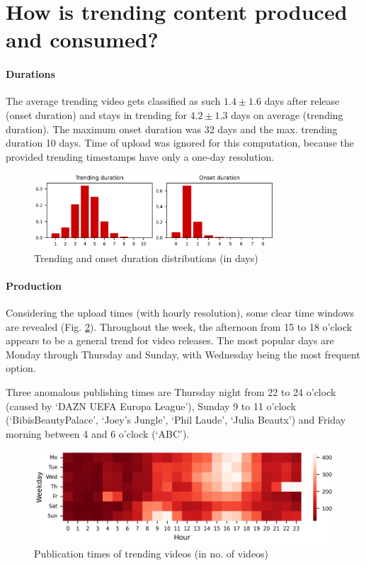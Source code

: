 \documentclass{article}
\begin{document}
\section{How is trending content produced and consumed?}
\paragraph{Durations} The average trending video gets classified as such $1.4 \pm 1.6$ days after release (onset duration) and stays in trending for $4.2 \pm 1.3$ days on average (trending duration). The maximum onset duration was 32 days and the max. trending duration 10 days. Time of upload was ignored for this computation, because the provided trending timestamps have only a one-day resolution.

\begin{figure}[h]
    \centering
    \includegraphics[width=0.8\textwidth]{fig/durations.png}
    \caption{Trending and onset duration distributions (in days)}
    \label{fig:durations}
\end{figure}

\paragraph{Production} Considering the upload times (with hourly resolution), some clear time windows are revealed (Fig. \ref{fig:pub_time}). Throughout the week, the afternoon from 15 to 18 o'clock appears to be a general trend for video releases. The most popular days are Monday through Thursday and Sunday, with Wednesday being the most frequent option. 

Three anomalous publishing times are Thursday night from 22 to 24 o'clock (caused by `DAZN UEFA Europa League'), Sunday 9 to 11 o'clock (`BibisBeautyPalace', `Joey's Jungle', `Phil Laude', `Julia Beautx') and Friday morning between 4 and 6 o'clock (`ABC').

\begin{figure}[h]
    \centering
    \includegraphics[width=\textwidth]{fig/pub_time.png}
    \caption{Publication times of trending videos (in no. of videos)}
    \label{fig:pub_time}
\end{figure}
\end{document}
